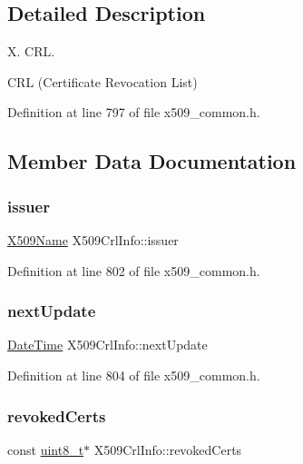 \subsection{Detailed Description}
X. C\+RL. 

C\+RL (Certificate Revocation List) 

Definition at line 797 of file x509\+\_\+common.\+h.



\subsection{Member Data Documentation}
\mbox{\label{structX509CrlInfo_a689dc1b40dfa9fd14d4942fd370c6d22}} 
\subsubsection{\texorpdfstring{issuer}{issuer}}
{\footnotesize\ttfamily \hyperlink{structX509Name}{X509\+Name} X509\+Crl\+Info\+::issuer}



Definition at line 802 of file x509\+\_\+common.\+h.

\mbox{\label{structX509CrlInfo_acedf40dfe16a6628ce18eeace2280c4f}} 
\subsubsection{\texorpdfstring{next\+Update}{nextUpdate}}
{\footnotesize\ttfamily \hyperlink{structDateTime}{Date\+Time} X509\+Crl\+Info\+::next\+Update}



Definition at line 804 of file x509\+\_\+common.\+h.

\mbox{\label{structX509CrlInfo_a9e68db2343336e30ba20c583e2ec507a}} 
\subsubsection{\texorpdfstring{revoked\+Certs}{revokedCerts}}
{\footnotesize\ttfamily const \hyperlink{stdint_8h_aba7bc1797add20fe3efdf37ced1182c5}{uint8\+\_\+t}$\ast$ X509\+Crl\+Info\+::revoked\+Certs}



